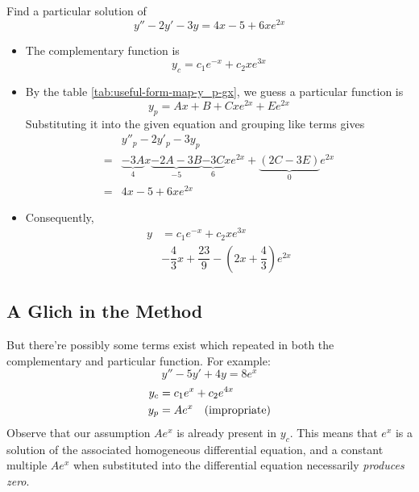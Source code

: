 \begin{example}
    Find a particular solution of
    \[
        y'' - 2y' -3 y = 4x - 5 + 6x e^{2x}
    \]

    \begin{itemize}
        \item The complementary function is
            \[
                y_c = c_1 e^{-x} + c_2 x e^{3x}
            \]
        \item By the table \ref{tab:useful-form-map-y_p-gx}, we guess a particular function is
            \[
                y_p = Ax + B + Cx e^{2x} + E e^{2x}
            \]
            Substituting it into the given equation and grouping like terms gives
            \begin{align*}
                  &y''_p - 2y'_p - 3y_p  \\
                = &\underbrace{-3A}_{4}x \underbrace{-2A -3B}_{-5} \underbrace{-3C}_{6} xe^{2x} + \underbrace{(2C - 3E)}_{0} e^{2x}\\
                = &4x - 5 + 6x e^{2x}
            \end{align*}
        \item Consequently,
            \begin{align*}
                y &= c_1 e^{-x} + c_2 x e^{3x}\\ 
                  &- \dfrac{4}{3} x + \dfrac{23}{9} - \left(2x + \dfrac{4}{3}\right) e^{2x}
            \end{align*}
    \end{itemize}
\end{example}

\subsection{A Glich in the Method}\label{glich-in-superposition-method}

But there're possibly some terms exist which repeated in both the complementary and particular function.
For example:
\begin{equation}\label{eq:example-non-homo-DE}
    y'' - 5y' + 4y = 8 e^x 
\end{equation}
\begin{align}
    y_c &= c_1 e^x + c_2 e^{4x} \notag\\
    y_p &= A e^x \quad  \mbox{(impropriate)} \label{eq:impropriate-guessed-particular-function-form}
\end{align}
Observe that our assumption $Ae^x$ is already present in $y_c$. This
means that $e^x$ is a solution of the associated 
homogeneous differential equation, and
a constant multiple $Ae^x$ when substituted into the 
differential equation necessarily
\emph{produces zero}\cite[page 146]{fcde}.

